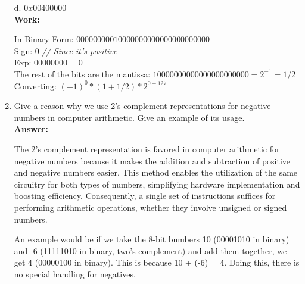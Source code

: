 \documentclass[11pt]{article}
\begin{document}
\begin{enumerate}
    d. $0x00400000$\\
    \textbf{Work:}
    \begin{center}
        In Binary Form: $0000 0000 0100 0000 0000 0000 0000 0000$\\
        Sign: $0$ \textit{// Since it's positive}\\
        Exp: $00000000 = 0$\\
        The rest of the bits are the mantissa: $100 0000 0000 0000 0000 0000 = 2^{-1} = 1/2$\\
        Converting: $(-1)^0 * (1 + 1/2) * 2^{0-127}$\\
    \end{center}
    
    \item Give a reason why we use 2's complement representations for negative numbers in computer
    arithmetic. Give an example of its usage.\\
    \textbf{Answer:}
    \begin{center}
        The 2's complement representation is favored in computer arithmetic for negative numbers because it makes the addition and subtraction of positive and negative numbers easier. 
        This method enables the utilization of the same circuitry for both types of numbers, simplifying hardware implementation and boosting efficiency. 
        Consequently, a single set of instructions suffices for performing arithmetic operations, whether they involve unsigned or signed numbers.

        An example would be if we take the 8-bit bumbers 10 (00001010 in binary) and -6 (11111010 in binary, two's complement) and add them together, we get 4 (00000100 in binary). This is because 10 + (-6) = 4.
        Doing this, there is no special handling for negatives.\\
    \end{center}
\end{enumerate}
\end{document}
